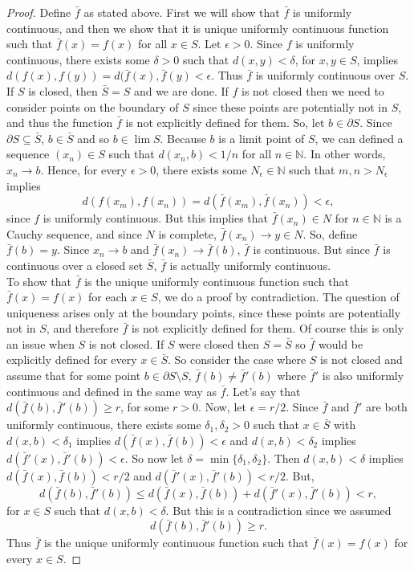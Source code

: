 \documentclass[11pt]{amsart}
\begin{document}
\begin{proof}
  Define $\bar{f}$ as stated above. First we will show that $\bar{f}$ is uniformly continuous, and then we show that it is unique uniformly continuous function such that $\bar{f}(x) = f(x)$ for all $x \in S$.
  Let $\epsilon > 0$. Since $f$ is uniformly continuous, there exists some $\delta > 0$ such that $d(x,y) < \delta$, for $x,y \in S$, implies $d(f(x), f(y)) = d(\bar{f}(x),\bar{f}(y) < \epsilon$. Thus $\bar{f}$ is uniformly continuous over $S$. If $S$ is closed, then $\bar{S} = S$ and we are done. 
  If $f$ is not closed then we need to consider points on the boundary of $S$ since these points are potentially not in $S$, and thus the function $\bar{f}$ is not explicitly defined for them. So, let $b \in \partial S$. Since $\partial S \subseteq \bar{S}$, $b \in \bar{S}$ and so $b \in \lim S$. Because $b$ is a limit point of $S$, we can defined a sequence $(x_{n})\in S$ such that $d(x_{n}, b) < 1/n$ for all $n\in\mathbb{N}$. In other words, $x_{n} \rightarrow b$. 
  Hence, for every $\epsilon > 0$, there exists some $N_{\epsilon} \in \mathbb{N}$ such that $m,n > N_{\epsilon}$ implies 
  \[ d(f(x_{m}), f(x_{n})) = d(\bar{f}(x_{m}), \bar{f}(x_{n})) < \epsilon, \]
  since $f$ is uniformly continuous. But this implies that $\bar{f}(x_{n}) \in N$ for $n\in\mathbb{N}$ is a Cauchy sequence, and since $N$ is complete, $\bar{f}(x_{n})\rightarrow y\in N$. So, define $\bar{f}(b) = y$. Since $x_{n}\rightarrow b$ and $\bar{f}(x_{n}) \rightarrow \bar{f}(b)$, $\bar{f}$ is continuous. But since $\bar{f}$ is continuous over a closed set $\bar{S}$, $\bar{f}$ is actually uniformly continuous. \\
  To show that $\bar{f}$ is the unique uniformly continuous function such that $\bar{f}(x) = f(x)$ for each $x \in S$, we do a proof by contradiction. The question of uniqueness arises only at the boundary points, since these points are potentially not in $S$, and therefore $\bar{f}$ is not explicitly defined for them. Of course this is only an issue when $S$ is not closed. If $S$ were closed then $S = \bar{S}$ so $\bar{f}$ would be explicitly defined for every $x \in \bar{S}$. So consider the case where $S$ is not closed and assume that for some point $b\in \partial S \setminus S$, $\bar{f}(b) \neq \bar{f}'(b)$ where $\bar{f}'$ is also uniformly continuous and defined in the same way as $\bar{f}$.
  Let's say that $d(\bar{f}(b), \bar{f}'(b)) \geq r$, for some $r > 0$. Now, let $\epsilon = r/2$. Since $\bar{f}$ and $\bar{f}'$ are both uniformly continuous, there exists some $\delta_{1}, \delta_{2} > 0$ such that $x\in \bar{S}$ with $d(x,b) < \delta_{1}$ implies $d(\bar{f}(x), \bar{f}(b)) < \epsilon$ and $d(x,b) < \delta_{2}$ implies $d(\bar{f}'(x), \bar{f}'(b)) < \epsilon$. So now let $\delta = \min\{\delta_{1}, \delta_{2}\}$. Then $d(x,b) < \delta$ implies $d(\bar{f}(x), \bar{f}(b)) < r/2$ and $d(\bar{f}'(x),\bar{f}'(b)) < r/2$. But,
  \[ d(\bar{f}(b), \bar{f}'(b)) \leq d(\bar{f}(x),\bar{f}(b)) + d(\bar{f}'(x), \bar{f}'(b)) < r, \]
  for $x\in S$ such that $d(x,b) < \delta$. But this is a contradiction since we assumed 
  \[ d(\bar{f}(b), \bar{f}'(b)) \geq r. \]
  Thus $\bar{f}$ is the unique uniformly continuous function such that $\bar{f}(x) = f(x)$ for every $x \in S$.
\end{proof}
\end{document}
